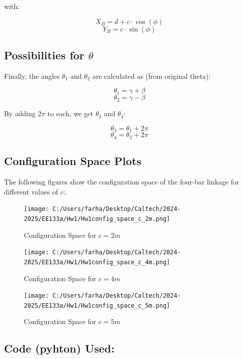 \documentclass[12pt]{article}
\begin{document}
with:

\[
X_B = d + c \cdot \cos(\phi)
\]
\[
Y_B = c \cdot \sin(\phi)
\]

\subsection*{Possibilities for \( \theta \)}

Finally, the angles \( \theta_1 \) and \( \theta_2 \) are calculated as (from original theta):

\[
\theta_1 = \gamma + \beta
\]
\[
\theta_2 = \gamma - \beta
\]

By adding \( 2\pi \) to each, we get \( \theta_3 \) and \( \theta_4 \):

\[
\theta_3 = \theta_1 + 2\pi
\]
\[
\theta_4 = \theta_2 + 2\pi
\]
\subsection*{Configuration Space Plots}

The following figures show the configuration space of the four-bar linkage for different values of \( c \):.


\begin{figure}[h!]
    \centering
    \texttt{[image: C:/Users/farha/Desktop/Caltech/2024-2025/EE133a/Hw1/Hw1config\_space\_c\_2m.png]}
    \caption{Configuration Space for \( c = 2m \)}
    \label{fig:c_2m}
\end{figure}


\begin{figure}[h!]
    \centering
    \texttt{[image: C:/Users/farha/Desktop/Caltech/2024-2025/EE133a/Hw1/Hw1config\_space\_c\_4m.png]}
    \caption{Configuration Space for \( c = 4m \)}
    \label{fig:c_4m}
\end{figure}


\begin{figure}[h!]
    \centering
    \texttt{[image: C:/Users/farha/Desktop/Caltech/2024-2025/EE133a/Hw1/Hw1config\_space\_c\_5m.png]}
    \caption{Configuration Space for \( c = 5m \)}
    \label{fig:c_5m}
\end{figure}

\clearpage

\subsection*{Code (pyhton) Used:}
\end{document}
